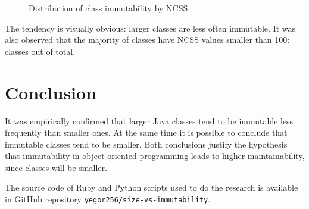 \documentclass[12pt]{article}
\begin{document}
\begin{figure}[h]
  
  \caption{Distribution of class immutability by NCSS}
  \label{fig:1}
\end{figure}

The tendency is visually obvious: larger classes are less often immutable. It
was also observed that the majority of classes have NCSS values smaller than 100:
\thebelowhundred{} classes out of \thetotaljavafiles{} total.

\section{Conclusion}

It was empirically confirmed that larger Java classes tend to be immutable
less frequently than smaller ones. At the same time it is possible to conclude
that immutable classes tend to be smaller. Both conclusions justify
the hypothesis that immutability in object-oriented programming leads
to higher maintainability, since classes will be smaller.

The source code of Ruby and Python scripts used to do the research
is available in GitHub repository \texttt{yegor256/size-vs-immutability}.


\end{document}
